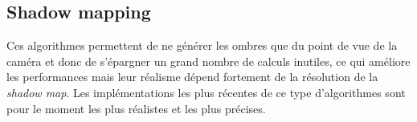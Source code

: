 \documentclass[a4paper,10pt]{report}
\begin{document}
\subsection{Shadow mapping}

Ces algorithmes permettent de ne générer les ombres que du point de vue de la caméra et donc de s'épargner un grand nombre de calculs inutiles, ce qui améliore les performances mais leur réalisme dépend fortement de la résolution de la \textit{shadow map}. Les implémentations les plus récentes de ce type d'algorithmes sont pour le moment les plus réalistes et les plus précises.




\end{document}
